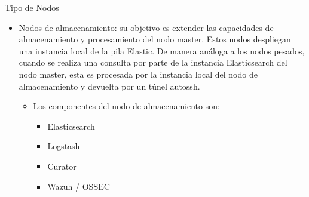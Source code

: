 \begin{subsubsection}{Tipo de Nodos}
\begin{itemize}
\begin{itemize}
\begin{itemize}
                    \item Snort / Suricata
                    \item Netsniff-ng
                    \item Wazuh / OSSEC
                    \item Syslog-ng (envía los logs a la instancia local de Logstash)
                \end{itemize}
            \end{itemize}
            \item Nodos de almacenamiento: su objetivo es extender las capacidades de almacenamiento y procesamiento del nodo master. Estos nodos despliegan una instancia local de la pila Elastic. De manera análoga a los nodos pesados, cuando se realiza una consulta por parte de la instancia Elasticsearch del nodo master, esta es procesada por la instancia local del nodo de almacenamiento y devuelta por un túnel autossh.
            \begin{itemize}
                \item Los componentes del nodo de almacenamiento son:
                \begin{itemize}
                    \item Elasticsearch
                    \item Logstash
                    \item Curator
                    \item Wazuh / OSSEC
                \end{itemize}
            \end{itemize}
        \end{itemize}
    \end{subsubsection}
    \pagebreak
